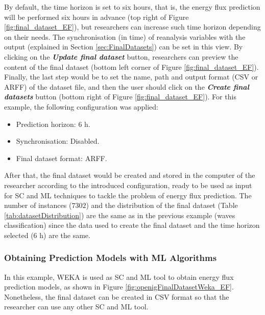 \documentclass[energies,article,accept,moreauthors,pdftex]{Definitions/mdpi}
\begin{document}
\begin{paracol}{2}
\switchcolumn


			By default, the time horizon is set to six hours, that is, the energy flux prediction will be performed six hours in advance (top right of Figure \ref{fig:final_dataset_EF}), but researchers can increase such time horizon depending on their needs. The synchronisation (in time) of reanalysis variables with the output (explained in Section {\ref{sec:FinalDatasets}}) can be set in this view. By clicking on the \textbf{\textit{Update final dataset}} button, researchers can preview the content of the final dataset (bottom left corner of  Figure  \ref{fig:final_dataset_EF}). Finally, the last step would be to set the name, path and output format (CSV or ARFF) of the dataset file, and then the user should click on the \textbf{\textit{Create final datasets}} button (bottom right of  Figure  \ref{fig:final_dataset_EF}). For this example, the following configuration was applied:
			\begin{itemize}
				\item Prediction horizon: 6 h.
				\item Synchronisation: Disabled.
				\item Final dataset format: ARFF.
			\end{itemize}
			
			After that, the final dataset would be created and stored in the computer of the researcher according to the introduced configuration, ready to be used as input for SC and ML techniques to tackle the problem of energy flux prediction. The number of instances ($7302$) and the distribution of the final dataset (Table \ref{tab:datasetDistribution}) are the same as in the previous example (waves classification) since the data used to create the final dataset and the time horizon selected (6 h) are the same.

		\subsubsection{Obtaining Prediction Models with ML Algorithms}

			In this example, WEKA is used as SC and ML tool to obtain energy flux prediction models, as shown in Figure \ref{fig:openigFinalDatasetWeka_EF}. Nonetheless, the final dataset can be created in CSV format so that the researcher can use any other SC and ML tool.

\end{paracol}
\end{document}

